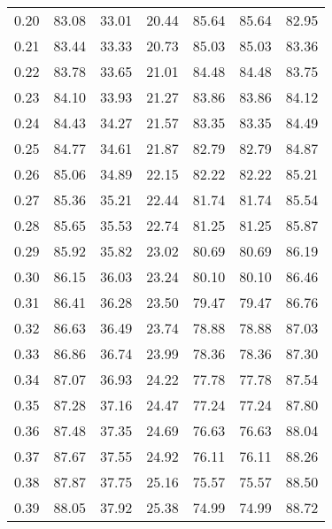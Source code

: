 \begin{tabular}{|c|c|c|c|c|c|c|}
      0.20 &     83.08 &     33.01 &      20.44 &   85.64 &      85.64 &         82.95 \\
      0.21 &     83.44 &     33.33 &      20.73 &   85.03 &      85.03 &         83.36 \\
      0.22 &     83.78 &     33.65 &      21.01 &   84.48 &      84.48 &         83.75 \\
      0.23 &     84.10 &     33.93 &      21.27 &   83.86 &      83.86 &         84.12 \\
      0.24 &     84.43 &     34.27 &      21.57 &   83.35 &      83.35 &         84.49 \\
      0.25 &     84.77 &     34.61 &      21.87 &   82.79 &      82.79 &         84.87 \\
      0.26 &     85.06 &     34.89 &      22.15 &   82.22 &      82.22 &         85.21 \\
      0.27 &     85.36 &     35.21 &      22.44 &   81.74 &      81.74 &         85.54 \\
      0.28 &     85.65 &     35.53 &      22.74 &   81.25 &      81.25 &         85.87 \\
      0.29 &     85.92 &     35.82 &      23.02 &   80.69 &      80.69 &         86.19 \\
      0.30 &     86.15 &     36.03 &      23.24 &   80.10 &      80.10 &         86.46 \\
      0.31 &     86.41 &     36.28 &      23.50 &   79.47 &      79.47 &         86.76 \\
      0.32 &     86.63 &     36.49 &      23.74 &   78.88 &      78.88 &         87.03 \\
      0.33 &     86.86 &     36.74 &      23.99 &   78.36 &      78.36 &         87.30 \\
      0.34 &     87.07 &     36.93 &      24.22 &   77.78 &      77.78 &         87.54 \\
      0.35 &     87.28 &     37.16 &      24.47 &   77.24 &      77.24 &         87.80 \\
      0.36 &     87.48 &     37.35 &      24.69 &   76.63 &      76.63 &         88.04 \\
      0.37 &     87.67 &     37.55 &      24.92 &   76.11 &      76.11 &         88.26 \\
      0.38 &     87.87 &     37.75 &      25.16 &   75.57 &      75.57 &         88.50 \\
      0.39 &     88.05 &     37.92 &      25.38 &   74.99 &      74.99 &         88.72 \\

\end{tabular}
